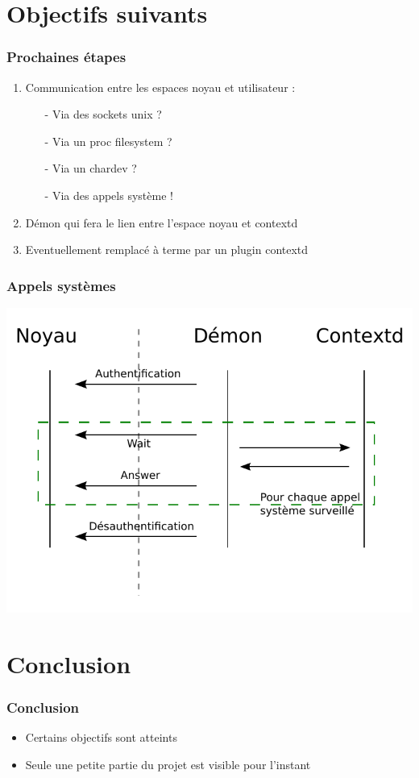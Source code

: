 \documentclass{beamer}
\begin{document}
\section{Objectifs suivants}
\begin{frame}
\frametitle{Prochaines étapes}
\begin{enumerate}
	\item Communication entre les espaces noyau et utilisateur :
	\begin{itemize}
		\item[-] Via des sockets unix ?
		\item[-] Via un proc filesystem ?
		\item[-] Via un chardev ?
		\item[-] Via des appels système !
	\end{itemize}
	\item Démon qui fera le lien entre l'espace noyau et contextd
	\item Eventuellement remplacé à terme par un plugin contextd
\end{enumerate}
\end{frame}

\begin{frame}
\frametitle{Appels systèmes}
\begin{center}
	\includegraphics[scale=0.75]{global.pdf}
\end{center}
\end{frame}

\section{Conclusion}
\begin{frame}
\frametitle{Conclusion}
\begin{itemize}
	\item Certains objectifs sont atteints
	\item Seule une petite partie du projet est visible pour l'instant
\end{itemize}
\end{frame}
\end{document}
